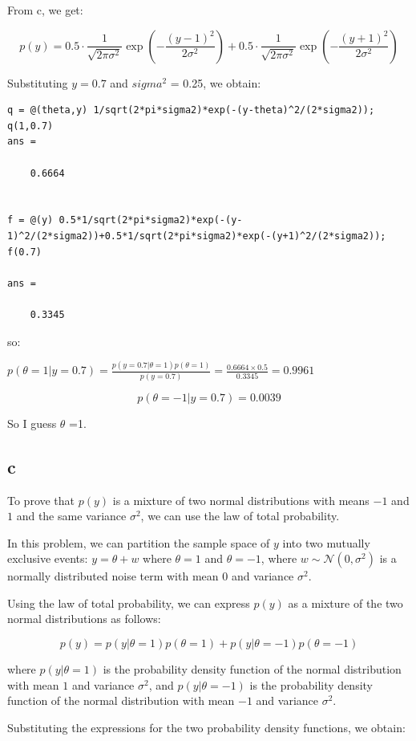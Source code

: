 From c, we get:

$$p(y) = 0.5 \cdot \frac{1}{\sqrt{2 \pi \sigma^2}} \exp \left(-\frac{(y - 1)^2}{2 \sigma^2}\right) + 0.5 \cdot \frac{1}{\sqrt{2 \pi \sigma^2}} \exp \left(-\frac{(y + 1)^2}{2 \sigma^2}\right)$$

Substituting $y=0.7$ and $sigma^2$ = 0.25, we obtain:
\begin{lstlisting}
q = @(theta,y) 1/sqrt(2*pi*sigma2)*exp(-(y-theta)^2/(2*sigma2));
q(1,0.7)
ans =

    0.6664


f = @(y) 0.5*1/sqrt(2*pi*sigma2)*exp(-(y-1)^2/(2*sigma2))+0.5*1/sqrt(2*pi*sigma2)*exp(-(y+1)^2/(2*sigma2));
f(0.7)

ans =

    0.3345
\end{lstlisting}

so:

$p(\theta=1 | y=0.7) = \frac{p(y=0.7 | \theta=1) p(\theta=1)}{p(y=0.7)} = \frac{0.6664\times0.5}{0.3345}=0.9961$

$$p(\theta=-1 | y=0.7) = 0.0039$$

So I guess $ \theta $ =1.

\subsection{c}

To prove that $p(y)$ is a mixture of two normal distributions with means $-1$ and $1$ and the same variance $\sigma^2$, we can use the law of total probability.

In this problem, we can partition the sample space of $y$ into two mutually exclusive events: $y = \theta + w$ where $\theta = 1$ and $\theta = -1$, where $w \sim \mathcal{N}(0, \sigma^2)$ is a normally distributed noise term with mean $0$ and variance $\sigma^2$. 

Using the law of total probability, we can express $p(y)$ as a mixture of the two normal distributions as follows:

$$p(y) = p(y | \theta = 1) p(\theta = 1) + p(y | \theta = -1) p(\theta = -1)$$

where $p(y | \theta = 1)$ is the probability density function of the normal distribution with mean $1$ and variance $\sigma^2$, and $p(y | \theta = -1)$ is the probability density function of the normal distribution with mean $-1$ and variance $\sigma^2$.

Substituting the expressions for the two probability density functions, we obtain:

